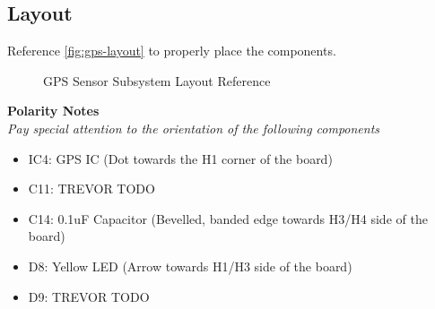 \documentclass{article}
\begin{document}
\subsection{Layout}

Reference \autoref{fig:gps-layout} to properly place the components.

\begin{figure}[H]
    \centering
        \qquad
        \caption{GPS Sensor Subsystem Layout Reference}%
    \label{fig:gps-layout}%
\end{figure}

\noindent \textbf{Polarity Notes}\\
\noindent \textit{Pay special attention to the orientation of the following components}
\begin{itemize}
  \item IC4: GPS IC (Dot towards the H1 corner of the board)
  \item C11: TREVOR TODO
  \item C14: 0.1uF Capacitor (Bevelled, banded edge towards H3/H4 side of the board)
  \item D8: Yellow LED (Arrow towards H1/H3 side of the board)
  \item D9: TREVOR TODO
\end{itemize}
\end{document}
